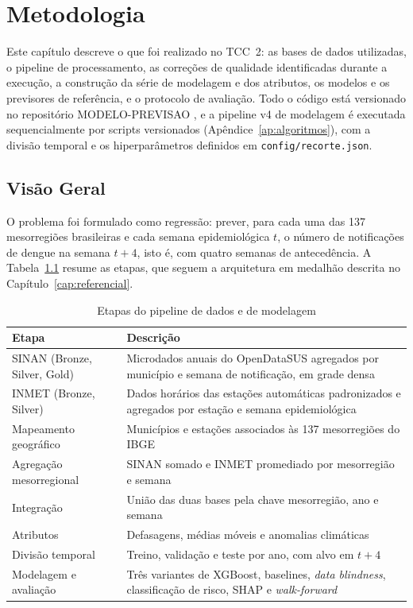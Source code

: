 \chapter{Metodologia}
\label{cap:metodologia}

Este capítulo descreve o que foi realizado no TCC~2: as bases de dados utilizadas, o pipeline de processamento, as correções de qualidade identificadas durante a execução, a construção da série de modelagem e dos atributos, os modelos e os previsores de referência, e o protocolo de avaliação. Todo o código está versionado no repositório MODELO-PREVISAO \cite{modeloprevisao2026}, e a pipeline v4 de modelagem é executada sequencialmente por scripts versionados (Apêndice~\ref{ap:algoritmos}), com a divisão temporal e os hiperparâmetros definidos em \texttt{config/recorte.json}.

\section{Visão Geral}

O problema foi formulado como regressão: prever, para cada uma das 137 mesorregiões brasileiras e cada semana epidemiológica $t$, o número de notificações de dengue na semana $t+4$, isto é, com quatro semanas de antecedência. A Tabela~\ref{tab:etapas_pipeline} resume as etapas, que seguem a arquitetura em medalhão descrita no Capítulo~\ref{cap:referencial}.

\begin{table}[htb]
\centering
\caption{Etapas do pipeline de dados e de modelagem}
\label{tab:etapas_pipeline}
\small
\begin{tabular}{|p{}|p{}|}
\hline
\textbf{Etapa} & \textbf{Descrição} \\ \hline
SINAN (Bronze, Silver, Gold) & Microdados anuais do OpenDataSUS agregados por município e semana de notificação, em grade densa \\ \hline
INMET (Bronze, Silver) & Dados horários das estações automáticas padronizados e agregados por estação e semana epidemiológica \\ \hline
Mapeamento geográfico & Municípios e estações associados às 137 mesorregiões do IBGE \\ \hline
Agregação mesorregional & SINAN somado e INMET promediado por mesorregião e semana \\ \hline
Integração & União das duas bases pela chave mesorregião, ano e semana \\ \hline
Atributos & Defasagens, médias móveis e anomalias climáticas \\ \hline
Divisão temporal & Treino, validação e teste por ano, com alvo em $t+4$ \\ \hline
Modelagem e avaliação & Três variantes de XGBoost, baselines, \textit{data blindness}, classificação de risco, SHAP e \textit{walk-forward} \\ \hline
\end{tabular}
\end{table}

